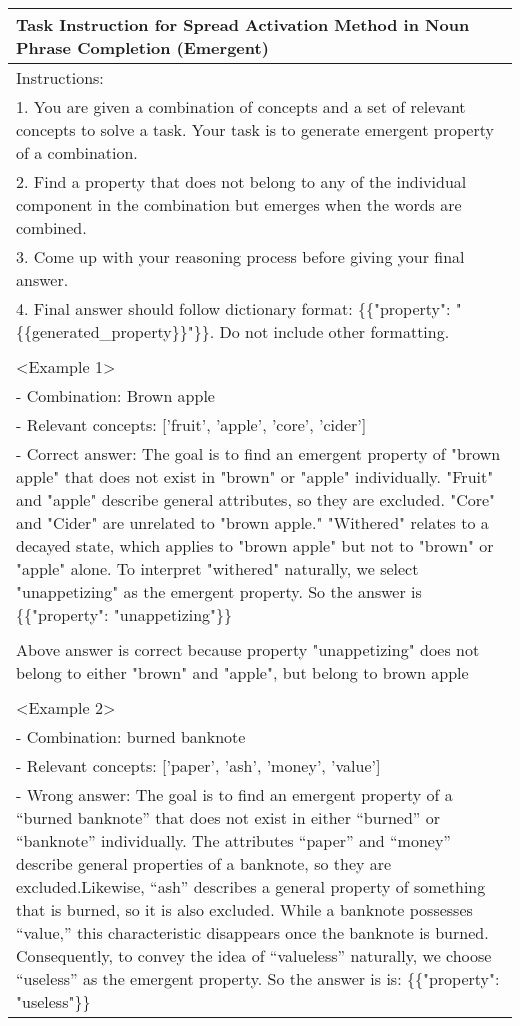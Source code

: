 \begin{table*}[htbp]
\scriptsize
\centering
\begin{tabular}{@{}p{\linewidth}@{}}
\toprule
\textbf{Task Instruction for Spread Activation Method in Noun Phrase Completion (Emergent)}\\
\midrule
Instructions:\\
1. You are given a combination of concepts and a set of relevant concepts to solve a task. Your task is to generate emergent property of a combination.\\
2. Find a property that does not belong to any of the individual component in the combination but emerges when the words are combined.\\
3. Come up with your reasoning process before giving your final answer.\\
4. Final answer should follow dictionary format: \{\{"property": "\{\{generated\_property\}\}"\}\}. Do not include other formatting.\\
    \\
<Example 1>\\
- Combination: Brown apple\\
- Relevant concepts: ['fruit', 'apple', 'core', 'cider']\\
- Correct answer: The goal is to find an emergent property of "brown apple" that does not exist in "brown" or "apple" individually. "Fruit" and "apple" describe general attributes, so they are excluded. "Core" and "Cider" are unrelated to "brown apple." "Withered" relates to a decayed state, which applies to "brown apple" but not to "brown" or "apple" alone. To interpret "withered" naturally, we select "unappetizing" as the emergent property. So the answer is \{\{"property": "unappetizing"\}\}\\
\\
Above answer is correct because property "unappetizing" does not belong to either "brown" and "apple", but belong to brown apple\\
\\
<Example 2>\\
- Combination: burned banknote\\
- Relevant concepts: ['paper', 'ash', 'money', 'value']\\
- Wrong answer: The goal is to find an emergent property of a “burned banknote” that does not exist in either “burned” or “banknote” individually. The attributes “paper” and “money” describe general properties of a banknote, so they are excluded.Likewise, “ash” describes a general property of something that is burned, so it is also excluded. While a banknote possesses “value,” this characteristic disappears once the banknote is burned. Consequently, to convey the idea of “valueless” naturally, we choose “useless” as the emergent property. So the answer is is: \{\{"property": "useless"\}\}\\

\end{tabular}
\end{table*}
